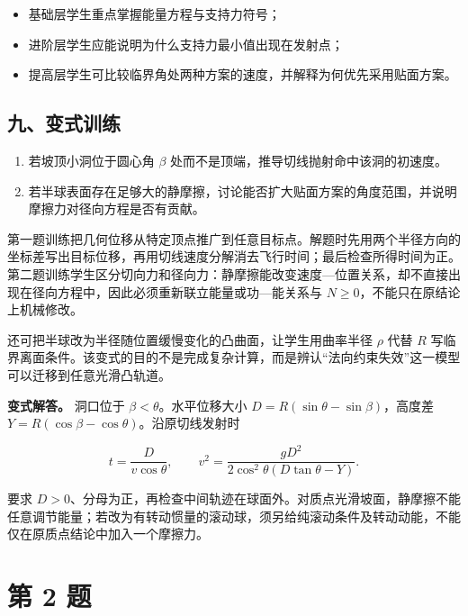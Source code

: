\documentclass[12pt,a4paper,UTF8]{ctexart}
\newcommand{\tightlist}{\setlength{\itemsep}{0pt}\setlength{\parskip}{0pt}}
\begin{document}
\begin{itemize}
\tightlist
\item
  基础层学生重点掌握能量方程与支持力符号；
\item
  进阶层学生应能说明为什么支持力最小值出现在发射点；
\item
  提高层学生可比较临界角处两种方案的速度，并解释为何优先采用贴面方案。
\end{itemize}

\subsection{九、变式训练}\label{ux4e5dux53d8ux5f0fux8badux7ec3}

\begin{enumerate}
\def\labelenumi{\arabic{enumi}.}
\tightlist
\item
  若坡顶小洞位于圆心角 \(\beta\)
  处而不是顶端，推导切线抛射命中该洞的初速度。
\item
  若半球表面存在足够大的静摩擦，讨论能否扩大贴面方案的角度范围，并说明摩擦力对径向方程是否有贡献。
\end{enumerate}

第一题训练把几何位移从特定顶点推广到任意目标点。解题时先用两个半径方向的坐标差写出目标位移，再用切线速度分解消去飞行时间；最后检查所得时间为正。第二题训练学生区分切向力和径向力：静摩擦能改变速度---位置关系，却不直接出现在径向方程中，因此必须重新联立能量或功---能关系与
\(N\geqslant0\)，不能只在原结论上机械修改。

还可把半球改为半径随位置缓慢变化的凸曲面，让学生用曲率半径 \(\rho\) 代替
\(R\)
写临界离面条件。该变式的目的不是完成复杂计算，而是辨认``法向约束失效''这一模型可以迁移到任意光滑凸轨道。

\textbf{变式解答。} 洞口位于 \(\beta<\theta\)。水平位移大小
\(D=R(\sin\theta-\sin\beta)\)，高度差
\(Y=R(\cos\beta-\cos\theta)\)。沿原切线发射时

\[t=\frac{D}{v\cos\theta},\qquad v^2=\frac{gD^2}{2\cos^2\theta(D\tan\theta-Y)}.\]

要求
\(D>0\)、分母为正，再检查中间轨迹在球面外。对质点光滑坡面，静摩擦不能任意调节能量；若改为有转动惯量的滚动球，须另给纯滚动条件及转动动能，不能仅在原质点结论中加入一个摩擦力。

\newpage

\section{第 2 题}\label{ux7b2c-2-ux9898}
\end{document}
